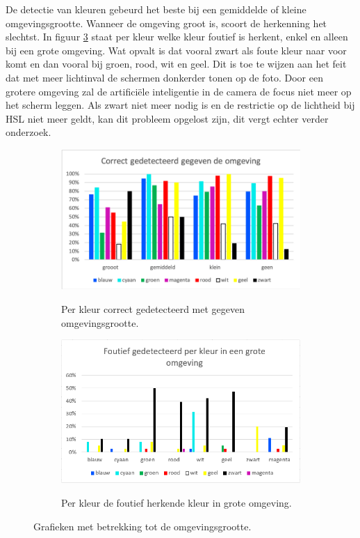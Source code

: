De detectie van kleuren gebeurd het beste bij een gemiddelde of kleine omgevingsgrootte. Wanneer de omgeving groot is, scoort de herkenning het slechtst. In figuur \ref{fig:groteOmgevingFoutHerkent} staat per kleur welke kleur foutief is herkent, enkel en alleen bij een grote omgeving. Wat opvalt is dat vooral zwart als foute kleur naar voor komt en dan vooral bij groen, rood, wit en geel. Dit is toe te wijzen aan het feit dat met meer lichtinval de schermen donkerder tonen op de foto. Door een grotere omgeving zal de artificiële inteligentie in de camera de focus niet meer op het scherm leggen. Als zwart niet meer nodig is en de restrictie op de lichtheid bij HSL niet meer geldt, kan dit probleem opgelost zijn, dit vergt echter verder onderzoek.
\begin{figure}
	\begin{subfigure}{0.5\textwidth}
	\centering
	\includegraphics{img/Environment}
	\label{fig:omgeving}
	\caption{Per kleur correct gedetecteerd met gegeven omgevingsgrootte.}
	\end{subfigure}
	
	\begin{subfigure}{0.5\textwidth}
	\centering
	\includegraphics{img/BigEnvPerColor}
	\label{fig:groteOmgevingFoutHerkent}
	\caption{Per kleur de foutief herkende kleur in grote omgeving.}
	\end{subfigure}
	\caption{Grafieken met betrekking tot de omgevingsgrootte.}
\end{figure}

